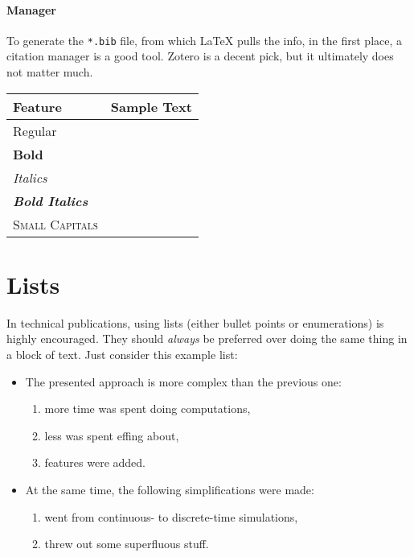 \paragraph{Manager}
To generate the \texttt{*.bib} file, from which \LaTeX{} pulls the info, in the first place, a citation manager is a good tool.
Zotero is a decent pick, but it ultimately does not matter much.
\begin{table}
	{%
		\sffamily
		\begin{tabular}{@{}ll@{}}%
		\toprule
			Feature & Sample Text\\
		\midrule
			Regular & \sampletext\\
			\textbf{Bold} & \textbf{\sampletext}\\
			\textit{Italics} & \textit{\sampletext}\\
			\textbf{\textit{Bold Italics}} & \textbf{\textit{\sampletext}}\\
			\textsc{Small Capitals} & \textsc{\sampletext}\\
		\bottomrule
		\end{tabular}
	}%
\end{table}
\section{Lists}
In technical publications, using lists (either bullet points or enumerations) is highly encouraged.
They should \emph{always} be preferred over doing the same thing in a block of text.
Just consider this example list:
\begin{itemize}
	\item The presented approach is more complex than the previous one:
	\begin{enumerate}
		\item more time was spent doing computations,
		\item less was spent effing about,
		\item features were added.
	\end{enumerate}
	\item At the same time, the following simplifications were made:
	\begin{enumerate}
		\item went from continuous- to discrete-time simulations,
		\item threw out some superfluous stuff.
	\end{enumerate}
\end{itemize}

